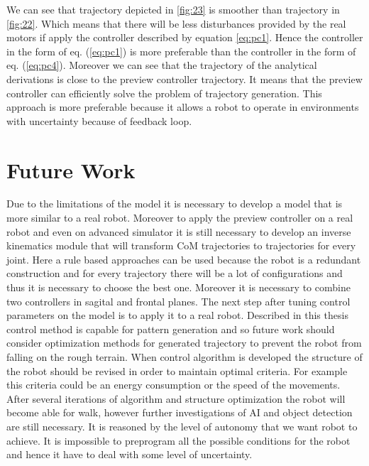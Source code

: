 \documentclass[12pt,a4paper]{report}
\begin{document}
		 	We can see that trajectory depicted in \cref{fig:23} is smoother than trajectory in \cref{fig:22}. Which means that there will be less disturbances provided by the real motors if apply the controller described by equation \ref{eq:pc1}. Hence the controller in the form of eq. (\ref{eq:pc1}) is more preferable than the controller in the form of eq. (\ref{eq:pc4}).
		 	Moreover we can see that the trajectory of the analytical derivations is close to the preview controller trajectory. It means that the preview controller can efficiently solve the problem of trajectory generation. This approach is more preferable because it allows a robot to operate in environments with uncertainty because of feedback loop.
	\chapter{Future Work}
		Due to the limitations of the model it is necessary to develop a model that is more similar to a real robot. Moreover to apply the preview controller on a real robot and even on advanced simulator it is still necessary to develop an inverse kinematics module that will transform CoM trajectories to trajectories for every joint. Here a rule based approaches can be used because the robot is a redundant construction and for every trajectory there will be a lot of configurations and thus it is necessary to choose the best one. Moreover it is necessary to combine two controllers in sagital and frontal planes.
		The next step after tuning control parameters on the model is to apply it to a real robot.
		Described in this thesis control method is capable for pattern generation and so future work should consider optimization methods for generated trajectory to prevent the robot from falling on the rough terrain.
		When control algorithm is developed the structure of the robot should be revised in order to maintain optimal criteria. For example this criteria could be an energy consumption or the speed of the movements.
		After several iterations of algorithm and structure optimization the robot will become able for walk, however further investigations of AI and object detection are still necessary. It is reasoned by the level of autonomy that we want robot to achieve. It is impossible to preprogram all the possible conditions for the robot and hence it have to deal with some level of uncertainty.
\end{document}
